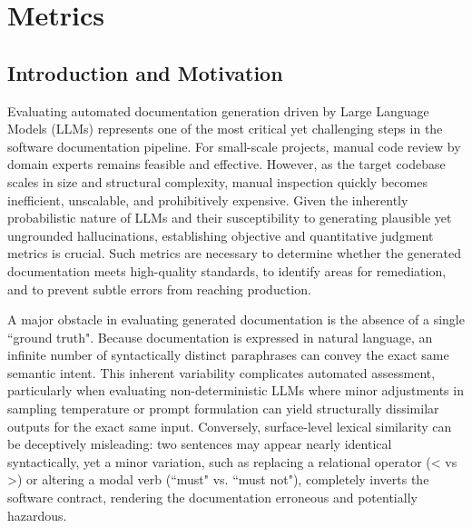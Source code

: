 \chapter{Metrics}
\label{ch:metrics}


\section{Introduction and Motivation} 
\label{sec:metrics-intro} 
Evaluating automated documentation generation driven by Large Language Models (LLMs) represents one of the most critical yet challenging steps in the software documentation pipeline. For small-scale projects, manual code review by domain experts remains feasible and effective. However, as the target codebase scales in size and structural complexity, manual inspection quickly becomes inefficient, unscalable, and prohibitively expensive. Given the inherently probabilistic nature of LLMs and their susceptibility to generating plausible yet ungrounded hallucinations, establishing objective and quantitative judgment metrics is crucial. Such metrics are necessary to determine whether the generated documentation meets high-quality standards, to identify areas for remediation, and to prevent subtle errors from reaching production. 

A major obstacle in evaluating generated documentation is the absence of a single ``ground truth". Because documentation is expressed in natural language, an infinite number of syntactically distinct paraphrases can convey the exact same semantic intent. This inherent variability complicates automated assessment, particularly when evaluating non-deterministic LLMs where minor adjustments in sampling temperature or prompt formulation can yield structurally dissimilar outputs for the exact same input. Conversely, surface-level lexical similarity can be deceptively misleading: two sentences may appear nearly identical syntactically, yet a minor variation, such as replacing a relational operator (\textless{} vs \textgreater{}) or altering a modal verb (``must" vs. ``must not"), completely inverts the software contract, rendering the documentation erroneous and potentially hazardous. 

